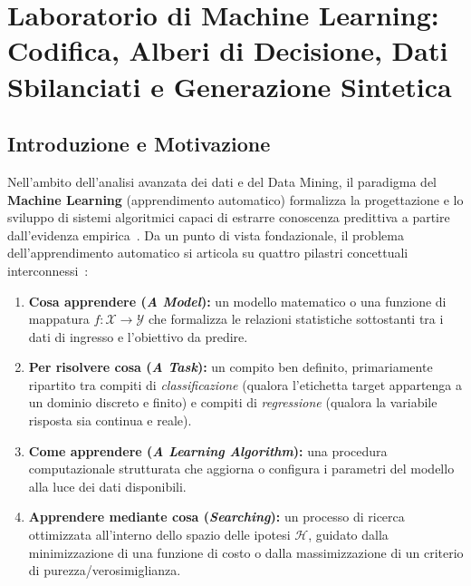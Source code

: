 \FloatBarrier
\section{Laboratorio di Machine Learning: Codifica, Alberi di Decisione, Dati Sbilanciati e Generazione Sintetica}
\label{ch:lab-ml-decision-trees-dati-sbilanciati}

\FloatBarrier
\subsection{Introduzione e Motivazione}
\label{sec:dm-ml-intro}

Nell'ambito dell'analisi avanzata dei dati e del Data Mining, il paradigma del \textbf{Machine Learning} (apprendimento automatico) formalizza la progettazione e lo sviluppo di sistemi algoritmici capaci di estrarre conoscenza predittiva a partire dall'evidenza empirica~\cite{tan2018, han2011}. Da un punto di vista fondazionale, il problema dell'apprendimento automatico si articola su quattro pilastri concettuali interconnessi~\cite{mannocci2026imbalanced}:
\begin{enumerate}
    \item \textbf{Cosa apprendere (\textit{A Model}):} un modello matematico o una funzione di mappatura $f: \mathcal{X} \to \mathcal{Y}$ che formalizza le relazioni statistiche sottostanti tra i dati di ingresso e l'obiettivo da predire.
    \item \textbf{Per risolvere cosa (\textit{A Task}):} un compito ben definito, primariamente ripartito tra compiti di \textit{classificazione} (qualora l'etichetta target appartenga a un dominio discreto e finito) e compiti di \textit{regressione} (qualora la variabile risposta sia continua e reale).
    \item \textbf{Come apprendere (\textit{A Learning Algorithm}):} una procedura computazionale strutturata che aggiorna o configura i parametri del modello alla luce dei dati disponibili.
    \item \textbf{Apprendere mediante cosa (\textit{Searching}):} un processo di ricerca ottimizzata all'interno dello spazio delle ipotesi $\mathcal{H}$, guidato dalla minimizzazione di una funzione di costo o dalla massimizzazione di un criterio di purezza/verosimiglianza.
\end{enumerate}

